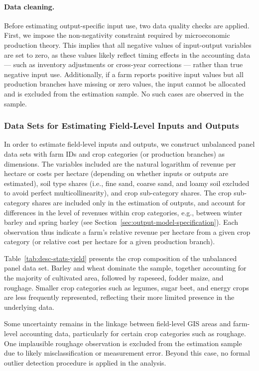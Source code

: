 \documentclass[12pt]{article}
\begin{document}
\paragraph{Data cleaning.} Before estimating output-specific input use, two data quality checks are applied. 
First, we impose the non-negativity constraint required by microeconomic production theory. 
This implies that all negative values of input-output variables are set to zero, as these values likely reflect timing effects in the accounting data --- such as inventory adjustments or cross-year corrections --- rather than true negative input use.
Additionally, if a farm reports positive input values but all production branches  have missing or zero values, the input cannot be allocated and is excluded from the estimation sample. 
No such cases are observed in the sample.


\subsubsection{Data Sets for Estimating Field-Level Inputs and Outputs}
\label{sec:data-ols} 
In order to estimate field-level inputs and outputs, we construct unbalanced panel data sets with farm IDs and crop categories (or production branches) as dimensions.
The variables included are the natural logarithm of revenue per hectare or costs per hectare (depending on whether inputs or outputs are estimated), soil type shares (i.e., fine sand, coarse sand, and loamy soil excluded to avoid perfect multicollinearity), and crop sub-category shares. 
The crop sub-category shares are included only in the estimation of outputs, and account for differences in the level of revenues within crop categories, e.g., between winter barley and spring barley (see Section~\ref{sec:output-model-specification}).
Each observation thus indicate a farm's relative revenue per hectare from a given crop category (or relative cost per hectare for a given production branch).


Table~\ref{tab:desc-stats-yield} presents the crop composition of the unbalanced panel data set. 
Barley and wheat dominate the sample, together accounting for the majority of cultivated area, followed by rapeseed, fodder maize, and roughage. 
Smaller crop categories such as legumes, sugar beet, and energy crops are less frequently represented, reflecting their more limited presence in the underlying data.

Some uncertainty remains in the linkage between field-level GIS areas and farm-level accounting data, particularly for certain crop categories such as roughage. 
One implausible roughage observation is excluded from the estimation sample due to likely misclassification or measurement error. 
Beyond this case, no formal outlier detection procedure is applied in the analysis. 
\end{document}
